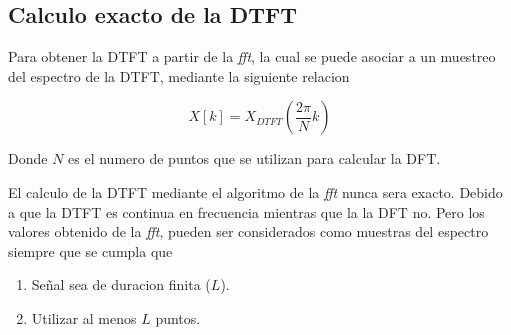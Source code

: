 \documentclass[letterpaper]{article}
\begin{document}
    
    \subsection*{Calculo exacto de la DTFT}

    Para obtener la DTFT a partir de la \textit{fft}, la cual se puede asociar a un muestreo del espectro
    de la DTFT, mediante la siguiente relacion 

    \begin{equation}
        X[k]=X_{DTFT}\left(  \frac{2 \pi}{N} k \right)
    \end{equation}

    Donde $N$ es el numero de puntos que se utilizan para calcular la DFT.

    El calculo de la DTFT mediante el algoritmo de la \textit{fft} nunca sera exacto. Debido a que la DTFT es continua en frecuencia 
    mientras que la la DFT no. Pero los valores obtenido de la \textit{fft}, pueden ser considerados como muestras del espectro siempre que se 
    cumpla que 

    \begin{enumerate}
        \item Señal sea de duracion finita ($L$).
        \item Utilizar al menos $L$ puntos.
    \end{enumerate}

    
\end{document}
